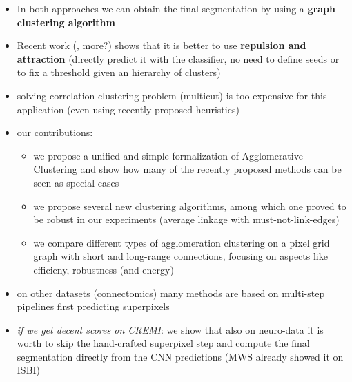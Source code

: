 \begin{itemize}
\item In both approaches we can obtain the final segmentation by using a \textbf{graph clustering algorithm}
\item Recent work (\cite{wolf2018mutex}, more?) shows that it is better to use \textbf{repulsion and attraction} (directly predict it with the classifier, no need to define seeds or to fix a threshold given an hierarchy of clusters)
\item solving correlation clustering problem (multicut) is too expensive for this application (even using recently proposed heuristics)
\item our contributions:
\begin{itemize}
\item we propose a unified and simple formalization of Agglomerative Clustering and show how many of the recently proposed methods can be seen as special cases
\item we propose several new clustering algorithms, among which one proved to be robust in our experiments (average linkage with must-not-link-edges)
\item we compare different types of agglomeration clustering on a pixel grid graph with short and long-range connections, focusing on aspects like efficieny, robustness (and energy) 

\end{itemize}
\item on other datasets (connectomics) many methods are based on multi-step pipelines first predicting superpixels
\item \textit{if we get decent scores on CREMI}: we show that also on neuro-data it is worth to skip the hand-crafted superpixel step and compute the final segmentation directly from the CNN predictions (MWS already showed it on ISBI)

\end{itemize}
